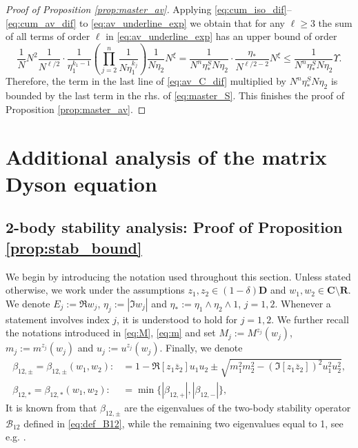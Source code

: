 \documentclass[10pt]{amsart}
\numberwithin{equation}{section}
\newcommand{\R}{\mathbf{R}}
\newcommand{\C}{\mathbf{C}}
\begin{document}
\begin{proof}[Proof of Proposition \ref{prop:master_av}]
Applying \eqref{eq:cum_iso_dif}--\eqref{eq:cum_av_dif} to \eqref{eq:av_underline_exp} we obtain that for any $\ell\ge 3$ the sum of all terms of order $\ell$ in \eqref{eq:av_underline_exp} has an upper bound of order
\begin{equation*}
\frac{1}{N}N^2 \frac{1}{N^{\ell/2}}\cdot \frac{1}{\eta_1^{k_1-1}} \left(\prod_{j=2}^n \frac{1}{N\eta_1^{k_j}}\right) \frac{1}{N\eta_2}N^\xi = \frac{1}{N^n \eta_*^S N\eta_2}\cdot\frac{\eta_*}{N^{\ell/2-2}}N^\xi\le \frac{1}{N^n \eta_*^S N\eta_2}\Upsilon.
\end{equation*}
Therefore, the term in the last line of \eqref{eq:av_C_dif} multiplied by $N^n \eta_*^S N\eta_2$ is bounded by the last term in the rhs. of \eqref{eq:master_S}. This finishes the proof of Proposition \ref{prop:master_av}.
\end{proof}




\appendix

\section{Additional analysis of the matrix Dyson equation} 

\subsection{2-body stability analysis: Proof of Proposition \ref{prop:stab_bound}}\label{app:stab_bound}

We begin by introducing the notation used throughout this section. Unless stated otherwise, we work under the assumptions $z_1,z_2\in (1-\delta)\mathbf{D}$ and $w_1,w_2\in \C\setminus\R$. We denote $E_j:=\Re w_j$, $\eta_j:=|\Im w_j|$ and $\eta_*:=\eta_1\wedge\eta_2\wedge 1$, $j=1,2$. Whenever a statement involves index $j$, it is understood to hold for $j=1,2$. We further recall the notations introduced in \eqref{eq:M}, \eqref{eq:m} and set $M_j:=M^{z_j}(w_j)$, $m_j:=m^{z_j}(w_j)$ and $u_j:=u^{z_j}(w_j)$. Finally, we denote
\begin{equation}
\begin{split}
\beta_{12,\pm} =\beta_{12,\pm}(w_1,w_2) :&=1-\Re \left[z_1\overline{z}_2\right] u_1u_2\pm \sqrt{m_1^2m_2^2 - \left(\Im \left[z_1\overline{z}_2\right]\right)^2u_1^2u_2^2},\\
\beta_{12,*}=\beta_{12,*}(w_1,w_2):&=\min\{|\beta_{12,+}|,|\beta_{12,-}|\},
\end{split}
\label{eq:def_beta_pm_main}
\end{equation}
It is known from \cite[Appendix B]{Cipolloni_meso} that $\beta_{12,\pm}$ are the eigenvalues of the two-body stability operator $\mathcal{B}_{12}$ defined in \eqref{eq:def_B12}, while the remaining two eigenvalues equal to 1, see e.g. \cite[Appendix B]{Cipolloni_meso}.
\end{document}
